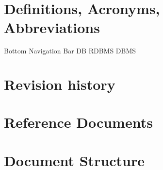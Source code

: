 \section{Definitions, Acronyms, Abbreviations}
Bottom Navigation Bar
DB
RDBMS
DBMS

\section{Revision history}
\section{Reference Documents}
\section{Document Structure}
